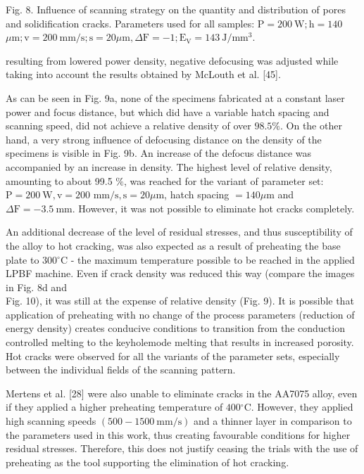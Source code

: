 \documentclass[10pt]{article}
\begin{document}
Fig. 8. Influence of scanning strategy on the quantity and distribution of pores and solidification cracks. Parameters used for all samples: $\mathrm{P}=200 \mathrm{~W} ; \mathrm{h}=140$ $\mu \mathrm{m} ; \mathrm{v}=200 \mathrm{~mm} / \mathrm{s} ; \mathrm{s}=20 \mu \mathrm{m}, \Delta \mathrm{F}=-1 ; \mathrm{E}_{\mathrm{V}}=143 \mathrm{~J} / \mathrm{mm}^{3}$.

resulting from lowered power density, negative defocusing was adjusted while taking into account the results obtained by McLouth et al. [45].

As can be seen in Fig. 9a, none of the specimens fabricated at a constant laser power and focus distance, but which did have a variable hatch spacing and scanning speed, did not achieve a relative density of over $98.5 \%$. On the other hand, a very strong influence of defocusing distance on the density of the specimens is visible in Fig. 9b. An increase of the defocus distance was accompanied by an increase in density. The highest level of relative density, amounting to about 99.5 $\%$, was reached for the variant of parameter set: $\mathrm{P}=200 \mathrm{~W}, \mathrm{v}=200$ $\mathrm{mm} / \mathrm{s}, \mathrm{s}=20 \mu \mathrm{m}$, hatch spacing $=140 \mu \mathrm{m}$ and $\Delta \mathrm{F}=-3.5 \mathrm{~mm}$. However, it was not possible to eliminate hot cracks completely.

An additional decrease of the level of residual stresses, and thus susceptibility of the alloy to hot cracking, was also expected as a result of preheating the base plate to $300{ }^{\circ} \mathrm{C}$ - the maximum temperature possible to be reached in the applied LPBF machine. Even if crack density was reduced this way (compare the images in Fig. 8d and\\
Fig. 10), it was still at the expense of relative density (Fig. 9). It is possible that application of preheating with no change of the process parameters (reduction of energy density) creates conducive conditions to transition from the conduction controlled melting to the keyholemode melting that results in increased porosity. Hot cracks were observed for all the variants of the parameter sets, especially between the individual fields of the scanning pattern.

Mertens et al. [28] were also unable to eliminate cracks in the AA7075 alloy, even if they applied a higher preheating temperature of $400{ }^{\circ} \mathrm{C}$. However, they applied high scanning speeds $(500-1500 \mathrm{~mm} / \mathrm{s})$ and a thinner layer in comparison to the parameters used in this work, thus creating favourable conditions for higher residual stresses. Therefore, this does not justify ceasing the trials with the use of preheating as the tool supporting the elimination of hot cracking.
\end{document}
